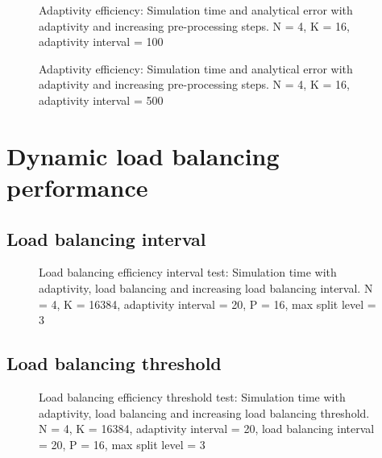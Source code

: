 \begin{figure}[H]
	\centering
	
	\caption{Adaptivity efficiency: Simulation time and analytical error with adaptivity and increasing pre-processing steps. N = 4, K = 16, adaptivity interval = 100}
	\label{fig:adaptivity_efficiency_C100}
\end{figure}

\begin{figure}[H]
	\centering
	
	\caption{Adaptivity efficiency: Simulation time and analytical error with adaptivity and increasing pre-processing steps. N = 4, K = 16, adaptivity interval = 500}
	\label{fig:adaptivity_efficiency_C500}
\end{figure}

\section{Dynamic load balancing performance} \label{section:results:load_balancing_performance}


\subsection{Load balancing interval} \label{section:results:load_balancing_performance:interval}

\begin{figure}[H]
	\centering
	
	\caption{Load balancing efficiency interval test: Simulation time with adaptivity, load balancing and increasing load balancing interval. N = 4, K = 16384, adaptivity interval = 20, P = 16, max split level = 3}
	\label{fig:load_balancing_efficiency_interval}
\end{figure}

\subsection{Load balancing threshold} \label{section:results:load_balancing_performance:threshold}

\begin{figure}[H]
	\centering
	
	\caption{Load balancing efficiency threshold test: Simulation time with adaptivity, load balancing and increasing load balancing threshold. N = 4, K = 16384, adaptivity interval = 20, load balancing interval = 20, P = 16, max split level = 3}
	\label{fig:load_balancing_efficiency_threshold_s3}
\end{figure}

